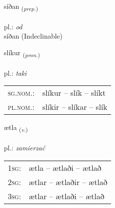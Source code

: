 \documentclass[frontgrid, backgrid]{flacards}\usepackage[]{graphicx}\usepackage[]{xcolor}
\begin{document}
{síðan \small{\textsubscript{(\textit{prep.})}} \\[1ex]
\textphonetic{[siːðan]} \\
pl.: \emph{od} \\  [2ex]
síðan (Indeclinable)}

\renewcommand{\flhead}{\vskip5pt \fboxsep=0pt {\small\bfseries\footnotesize Fornafn | Pronoun}}
\renewcommand{\fcfoot}{\vskip5pt \fboxsep=0pt \hspace{2pt}{\small\bfseries\footnotesize 1K}}

\renewcommand{\blhead}{\vskip5pt {\small\bfseries\footnotesize Fornafn | Pronoun }}
\renewcommand{\bcfoot}{\vskip5pt \hspace{2pt}{\small\bfseries\footnotesize 1K}}


{slíkur \small{\textsubscript{(\textit{pron.})}} \\[1ex] %
\textphonetic{[stliːkʏr]} \\
pl.: \emph{taki} \\  [2ex]
\renewcommand*{\arraystretch}{0.8}
\begin{tabular}{ll}
\textsc{sg.nom.}: & slíkur  --  slík -- slíkt \\ 
\textsc{pl.nom.}: & slíkir -- slíkar -- slík
\end{tabular}
}

\renewcommand{\flhead}{\vskip5pt \fboxsep=0pt {\small\bfseries\footnotesize Sagnorð | Verb}}
\renewcommand{\fcfoot}{\vskip5pt \fboxsep=0pt \hspace{2pt}{\small\bfseries\footnotesize 1K}}

\renewcommand{\blhead}{\vskip5pt {\small\bfseries\footnotesize Sagnorð | Verb }}
\renewcommand{\bcfoot}{\vskip5pt \hspace{2pt}{\small\bfseries\footnotesize 1K}}


{ætla \small{\textsubscript{(\textit{v.})}} \\[1ex] %
\textphonetic{[aihtla]} \\
pl.: \emph{zamierzać} \\  [2ex]
\renewcommand*{\arraystretch}{0.8}
\begin{tabular}{p{1cm}l}
\textsc{1sg}: & ætla -- ætlaði -- ætlað \\ 
\textsc{2sg}: & ætlar -- ætlaðir -- ætlað \\ 
\textsc{3sg}: & ætlar -- ætlaði -- ætlað \\ 
\end{tabular}
}
\end{document}

